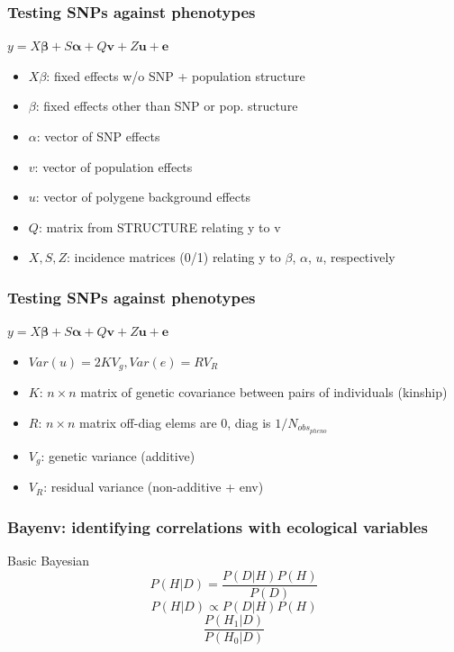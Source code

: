 \begin{frame}
\frametitle{Testing SNPs against phenotypes}
\begin{block}{}
\begin{center}
\Large{$y=X \bm{\beta} + S \bm{\alpha} + Q \bm{v} + Z \bm{u} + \bm{e}$}
\end{center}
\begin{itemize}
\item{$X \beta$: fixed effects w/o SNP + population structure}
\item{$\beta$: fixed effects other than SNP or pop. structure}
\item{$\alpha$: vector of SNP effects}
\item{$v$: vector of population effects}
\item{$u$: vector of polygene background effects}
\item{$Q$: matrix from STRUCTURE relating y to v}
\item{$X, S, Z$: incidence matrices (0/1) relating y to $\beta$, $\alpha$, $u$,
respectively}
\end{itemize}
\end{block}
\tiny
\citet{Yu:2006ij}
\end{frame}

\begin{frame}
\frametitle{Testing SNPs against phenotypes}
\begin{block}{}
\begin{center}
\Large{$y=X \bm{\beta} + S \bm{\alpha} + Q \bm{v} + Z \bm{u} + \bm{e}$}
\end{center}
\begin{itemize}
\item{$Var(u) = 2KV_g, Var(e) = RV_R$}
\item{$K$: $n \times n$ matrix of genetic covariance between pairs of
individuals (kinship)}
\item{$R$: $n \times n$ matrix off-diag elems are 0, diag is
$1/N_{{obs}_{pheno}}$}
\item{$V_g$: genetic variance (additive)}
\item{$V_R$: residual variance (non-additive + env)}
\end{itemize}
\end{block}
\tiny
\citet{Yu:2006ij}
\end{frame}

\begin{frame}
\frametitle{Bayenv: identifying correlations with ecological
variables}
\begin{block}{Basic Bayesian}
\begin{equation}
P(H | D) = \frac{P(D|H)P(H)}{P(D)}	
\end{equation}
\begin{equation}
P(H|D) \propto P(D|H)P(H)
\end{equation}
\begin{equation}
\frac{P(H_1|D)}{P(H_0|D)}
\end{equation}
\end{block}
\end{frame}


